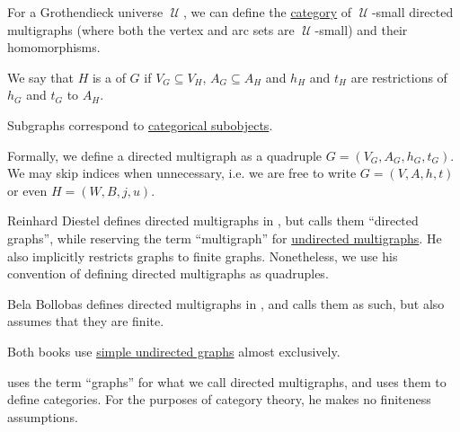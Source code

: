 \begin{definition}
\begin{thmenum}[resume=def:directed_multigraph]
     For a Grothendieck universe \( \mscrU \), we can define the \hyperref[def:category]{category} of \( \mscrU \)-small directed multigraphs (where both the vertex and arc sets are \( \mscrU \)-small) and their homomorphisms.

     We say that \( H \) is a  of \( G \) if \( V_G \subseteq V_H \), \( A_G \subseteq A_H \) and \( h_H \) and \( t_H \) are restrictions of \( h_G \) and \( t_G \) to \( A_H \).

    Subgraphs correspond to \hyperref[def:subobject_and_quotient]{categorical subobjects}.
  \end{thmenum}
\end{definition}
\begin{comments}
  \item Formally, we define a directed multigraph as a quadruple \( G = (V_G, A_G, h_G, t_G) \). We may skip indices when unnecessary, i.e. we are free to write \( G = (V, A, h, t) \) or even \( H = (W, B, j, u) \).

  \item Reinhard Diestel defines directed multigraphs in \cite[28]{Diestel2005}, but calls them \enquote{directed graphs}, while reserving the term \enquote{multigraph} for \hyperref[def:undirected_multigraph]{undirected multigraphs}. He also implicitly restricts graphs to finite graphs. Nonetheless, we use his convention of defining directed multigraphs as quadruples.

  Bela Bollobas defines directed multigraphs in \cite[8]{Bollobas1998}, and calls them as such, but also assumes that they are finite.

  Both books use \hyperref[def:undirected_graph]{simple undirected graphs} almost exclusively.

   uses the term \enquote{graphs} for what we call directed multigraphs, and uses them to define categories. For the purposes of category theory, he makes no finiteness assumptions.
\end{comments}

